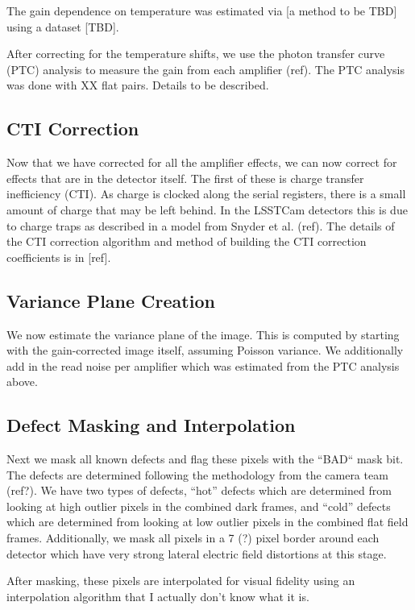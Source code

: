 \documentclass[SE,authoryear,lsstdraft,toc]{lsstdoc}
\begin{document}
The gain dependence on temperature was estimated via [a method to be TBD] using
a dataset [TBD].

After correcting for the temperature shifts, we use the photon transfer curve
(PTC) analysis to measure the gain from each amplifier (ref).  The PTC analysis was
done with XX flat pairs.  Details to be described.

\subsection{CTI Correction}
\label{sec:cti}

Now that we have corrected for all the amplifier effects, we can now correct
for effects that are in the detector itself.  The first of these is charge
transfer inefficiency (CTI).  As charge is clocked along the serial registers,
there is a small amount of charge that may be left behind.  In the LSSTCam
detectors this is due to charge traps as described in a model from Snyder et
al.  (ref).  The details of the CTI correction algorithm and method of building
the CTI correction coefficients is in [ref].

\subsection{Variance Plane Creation}

We now estimate the variance plane of the image.  This is computed by starting
with the gain-corrected image itself, assuming Poisson variance.  We
additionally add in the read noise per amplifier which was estimated from the
PTC analysis above.

\subsection{Defect Masking and Interpolation}

Next we mask all known defects and flag these pixels with the ``BAD`` mask bit.
The defects are determined following the methodology from the camera team
(ref?).  We have two types of defects, ``hot'' defects which are determined
from looking at high outlier pixels in the combined dark frames, and ``cold''
defects which are determined from looking at low outlier pixels in the combined
flat field frames.  Additionally, we mask all pixels in a 7 (?) pixel border
around each detector which have very strong lateral electric field distortions
at this stage.

After masking, these pixels are interpolated for visual fidelity using an
interpolation algorithm that I actually don't know what it is.
\end{document}
